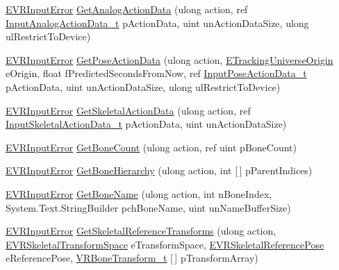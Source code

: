 \begin{DoxyCompactItemize}
\item 
\mbox{\hyperlink{namespace_valve_1_1_v_r_a592d7f4189b8346d6c96dbdbaa35bc1b}{E\+V\+R\+Input\+Error}} \mbox{\hyperlink{class_valve_1_1_v_r_1_1_c_v_r_input_a67e83bd0fced9bfd2d9a75743d65e64f}{Get\+Analog\+Action\+Data}} (ulong action, ref \mbox{\hyperlink{struct_valve_1_1_v_r_1_1_input_analog_action_data__t}{Input\+Analog\+Action\+Data\+\_\+t}} p\+Action\+Data, uint un\+Action\+Data\+Size, ulong ul\+Restrict\+To\+Device)
\item 
\mbox{\hyperlink{namespace_valve_1_1_v_r_a592d7f4189b8346d6c96dbdbaa35bc1b}{E\+V\+R\+Input\+Error}} \mbox{\hyperlink{class_valve_1_1_v_r_1_1_c_v_r_input_a24ab4067a314b30cfa4a197da5000635}{Get\+Pose\+Action\+Data}} (ulong action, \mbox{\hyperlink{namespace_valve_1_1_v_r_a29be99a3c2f780157bd490db06a7f12f}{E\+Tracking\+Universe\+Origin}} e\+Origin, float f\+Predicted\+Seconds\+From\+Now, ref \mbox{\hyperlink{struct_valve_1_1_v_r_1_1_input_pose_action_data__t}{Input\+Pose\+Action\+Data\+\_\+t}} p\+Action\+Data, uint un\+Action\+Data\+Size, ulong ul\+Restrict\+To\+Device)
\item 
\mbox{\hyperlink{namespace_valve_1_1_v_r_a592d7f4189b8346d6c96dbdbaa35bc1b}{E\+V\+R\+Input\+Error}} \mbox{\hyperlink{class_valve_1_1_v_r_1_1_c_v_r_input_a98350a9bdb1877c5943da40d2b9b2927}{Get\+Skeletal\+Action\+Data}} (ulong action, ref \mbox{\hyperlink{struct_valve_1_1_v_r_1_1_input_skeletal_action_data__t}{Input\+Skeletal\+Action\+Data\+\_\+t}} p\+Action\+Data, uint un\+Action\+Data\+Size)
\item 
\mbox{\hyperlink{namespace_valve_1_1_v_r_a592d7f4189b8346d6c96dbdbaa35bc1b}{E\+V\+R\+Input\+Error}} \mbox{\hyperlink{class_valve_1_1_v_r_1_1_c_v_r_input_a900b3c10d417e7833d5013f877a32e7a}{Get\+Bone\+Count}} (ulong action, ref uint p\+Bone\+Count)
\item 
\mbox{\hyperlink{namespace_valve_1_1_v_r_a592d7f4189b8346d6c96dbdbaa35bc1b}{E\+V\+R\+Input\+Error}} \mbox{\hyperlink{class_valve_1_1_v_r_1_1_c_v_r_input_aa466cccf4a5febf36c4a380d65efe898}{Get\+Bone\+Hierarchy}} (ulong action, int \mbox{[}$\,$\mbox{]} p\+Parent\+Indices)
\item 
\mbox{\hyperlink{namespace_valve_1_1_v_r_a592d7f4189b8346d6c96dbdbaa35bc1b}{E\+V\+R\+Input\+Error}} \mbox{\hyperlink{class_valve_1_1_v_r_1_1_c_v_r_input_a5070c6028a318616089fec51e137b930}{Get\+Bone\+Name}} (ulong action, int n\+Bone\+Index, System.\+Text.\+String\+Builder pch\+Bone\+Name, uint un\+Name\+Buffer\+Size)
\item 
\mbox{\hyperlink{namespace_valve_1_1_v_r_a592d7f4189b8346d6c96dbdbaa35bc1b}{E\+V\+R\+Input\+Error}} \mbox{\hyperlink{class_valve_1_1_v_r_1_1_c_v_r_input_a1b8a6482a2ac4a29be8e0186b5d4bbff}{Get\+Skeletal\+Reference\+Transforms}} (ulong action, \mbox{\hyperlink{namespace_valve_1_1_v_r_a916744fb3fc7b8e8ba224fba9bee6de4}{E\+V\+R\+Skeletal\+Transform\+Space}} e\+Transform\+Space, \mbox{\hyperlink{namespace_valve_1_1_v_r_a299b655881f873256f035349b59da09e}{E\+V\+R\+Skeletal\+Reference\+Pose}} e\+Reference\+Pose, \mbox{\hyperlink{struct_valve_1_1_v_r_1_1_v_r_bone_transform__t}{V\+R\+Bone\+Transform\+\_\+t}} \mbox{[}$\,$\mbox{]} p\+Transform\+Array)

\end{DoxyCompactItemize}
